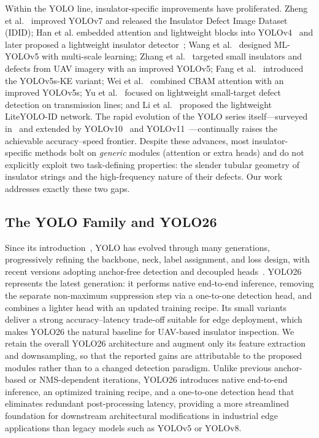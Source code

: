\documentclass[sensors,article,submit,pdftex,moreauthors]{Definitions/mdpi}
\begin{document}
Within the YOLO line, insulator-specific improvements have proliferated. Zheng et al.~\cite{zheng2022insulator} improved YOLOv7 and released the Insulator Defect Image Dataset (IDID); Han et al. embedded attention and lightweight blocks into YOLOv4~\cite{han2023improved} and later proposed a lightweight insulator detector~\cite{han2023lightweight}; Wang et al.~\cite{wang2024ml} designed ML-YOLOv5 with multi-scale learning; Zhang et al.~\cite{zhang2023lightweight} targeted small insulators and defects from UAV imagery with an improved YOLOv5; Fang et al.~\cite{fang2024yolov5ske} introduced the YOLOv5s-KE variant; Wei et al.~\cite{wei2024insulator} combined CBAM attention with an improved YOLOv5s; Yu et al.~\cite{yu2024application} focused on lightweight small-target defect detection on transmission lines; and Li et al.~\cite{yu2024lite} proposed the lightweight LiteYOLO-ID network. The rapid evolution of the YOLO series itself---surveyed in~\cite{hussain2023yolo} and extended by YOLOv10~\cite{wang2024yolov10} and YOLOv11~\cite{khanam2024yolov11}---continually raises the achievable accuracy--speed frontier. Despite these advances, most insulator-specific methods bolt on \emph{generic} modules (attention or extra heads) and do not explicitly exploit two task-defining properties: the slender tubular geometry of insulator strings and the high-frequency nature of their defects. Our work addresses exactly these two gaps.

\subsection{The YOLO Family and YOLO26}

Since its introduction~\cite{redmon2016yolo}, YOLO has evolved through many generations, progressively refining the backbone, neck, label assignment, and loss design, with recent versions adopting anchor-free detection and decoupled heads~\cite{hussain2023yolo,wang2024yolov10,khanam2024yolov11}. YOLO26~\cite{ultralytics2026yolo26} represents the latest generation: it performs native end-to-end inference, removing the separate non-maximum suppression step via a one-to-one detection head, and combines a lighter head with an updated training recipe. Its small variants deliver a strong accuracy--latency trade-off suitable for edge deployment, which makes YOLO26 the natural baseline for UAV-based insulator inspection. We retain the overall YOLO26 architecture and augment only its feature extraction and downsampling, so that the reported gains are attributable to the proposed modules rather than to a changed detection paradigm. Unlike previous anchor-based or NMS-dependent iterations, YOLO26 introduces native end-to-end inference, an optimized training recipe, and a one-to-one detection head that eliminates redundant post-processing latency, providing a more streamlined foundation for downstream architectural modifications in industrial edge applications than legacy models such as YOLOv5 or YOLOv8.
\end{document}
